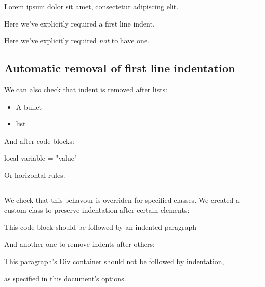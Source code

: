 \documentclass[
  letterpaper,
  DIV=11,
  numbers=noendperiod]{scrartcl}
\makeatletter
\newenvironment{Shaded}{\begin{snugshade}}{\end{snugshade}}
\newcommand{\KeywordTok}[1]{\textcolor[rgb]{0.00,0.23,0.31}{#1}}
\newcommand{\NormalTok}[1]{\textcolor[rgb]{0.00,0.23,0.31}{#1}}
\newcommand{\OperatorTok}[1]{\textcolor[rgb]{0.37,0.37,0.37}{#1}}
\newcommand{\StringTok}[1]{\textcolor[rgb]{0.13,0.47,0.30}{#1}}
\newcommand{\VariableTok}[1]{\textcolor[rgb]{0.07,0.07,0.07}{#1}}
\providecommand{\tightlist}{%
  \setlength{\itemsep}{0pt}\setlength{\parskip}{0pt}}\usepackage{longtable,booktabs,array}
\renewenvironment{quote}
     {\list{}{\listparindent 1.5em%
              \itemindent \listparindent
              \rightmargin \leftmargin
              \parsep \z@ \@plus \p@}%
            \item\noindent\relax}
      {\endlist}
\makeatother
\begin{document}
\begin{quote}
\noindent Lorem ipsum dolor sit amet, consectetur adipiscing elit.
\end{quote}

\indent Here we've explicitly required a first line indent.

\noindent Here we've explicitly required \emph{not} to have one.

\hypertarget{automatic-removal-of-first-line-indentation}{%
\subsection{Automatic removal of first line
indentation}\label{automatic-removal-of-first-line-indentation}}

We can also check that indent is removed after lists:

\begin{itemize}
\tightlist
\item
  A bullet
\item
  list
\end{itemize}

\noindent And after code blocks:

\begin{Shaded}
\begin{Highlighting}[]
\KeywordTok{local} \VariableTok{variable} \OperatorTok{=} \StringTok{"value"}
\end{Highlighting}
\end{Shaded}

\noindent Or horizontal rules.

\begin{center}\rule{0.5\linewidth}{0.5pt}\end{center}

\noindent We check that this behavour is overriden for specified
classes. We created a custom class to preserve indentation after certain
elements:

\begin{Shaded}
\begin{Highlighting}[]
\NormalTok{This code block }
\NormalTok{should be followed }
\NormalTok{by an indented }
\NormalTok{paragraph}
\end{Highlighting}
\end{Shaded}

And another one to remove indents after others:

This paragraph's Div container should not be followed by indentation,

\noindent as specified in this document's options.
\end{document}
